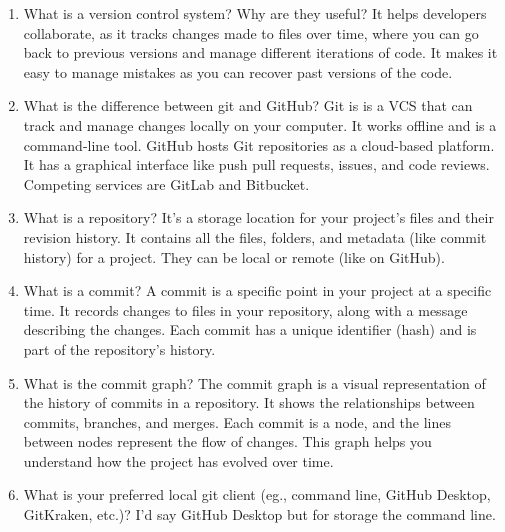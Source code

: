 \documentclass[10pt,twocolumn]{article}
\begin{document}
\begin{enumerate}
    \item What is a version control system? Why are they useful?
\newline
\newline It helps developers collaborate, as it tracks changes made to files over time, where you can go back to previous versions and manage different iterations of code. It makes it easy to manage mistakes as you can recover past versions of the code. 
    \item What is the difference between git and GitHub?
\newline
\newline Git is is a VCS that can track and manage changes locally on your computer. It works offline and is a command-line tool. GitHub hosts Git repositories as a cloud-based platform.  It has a graphical interface like push pull requests, issues, and code reviews. Competing services are GitLab and Bitbucket. 
    \item What is a repository?
\newline
\newline It's a storage location for your project's files and their revision history. It contains all the files, folders, and metadata (like commit history) for a project. They can be local  or remote (like on GitHub).
    \item What is a commit?
\newline
\newline A commit is a specific point in your project at a specific time. It records changes to files in your repository, along with a message describing the changes. Each commit has a unique identifier (hash) and is part of the repository's history.
    \item What is the commit graph?
\newline
\newline The commit graph is a visual representation of the history of commits in a repository. It shows the relationships between commits, branches, and merges. Each commit is a node, and the lines between nodes represent the flow of changes. This graph helps you understand how the project has evolved over time.
    \item What is your preferred local git client (eg., command line, GitHub Desktop, GitKraken, etc.)?
\newline
\newline I'd say GitHub Desktop but for storage the command line. 
\end{enumerate}
\end{document}
